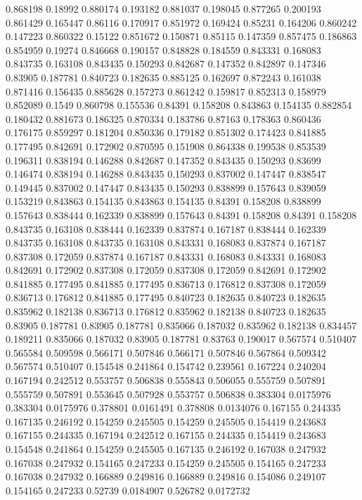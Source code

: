 0.868198 0.18992
0.880174 0.193182
0.881037 0.198045
0.877265 0.200193
0.861429 0.165447
0.86116 0.170917
0.851972 0.169424
0.85231 0.164206
0.860242 0.147223
0.860322 0.15122
0.851672 0.150871
0.85115 0.147359
0.857475 0.186863
0.854959 0.19274
0.846668 0.190157
0.848828 0.184559
0.843331 0.168083
0.843735 0.163108
0.843435 0.150293
0.842687 0.147352
0.842897 0.147346
0.83905 0.187781
0.840723 0.182635
0.885125 0.162697
0.872243 0.161038
0.871416 0.156435
0.885628 0.157273
0.861242 0.159817
0.852313 0.158979
0.852089 0.1549
0.860798 0.155536
0.84391 0.158208
0.843863 0.154135
0.882854 0.180432
0.881673 0.186325
0.870334 0.183786
0.87163 0.178363
0.860436 0.176175
0.859297 0.181204
0.850336 0.179182
0.851302 0.174423
0.841885 0.177495
0.842691 0.172902
0.870595 0.151908
0.864338 0.199538
0.853539 0.196311
0.838194 0.146288
0.842687 0.147352
0.843435 0.150293
0.83699 0.146474
0.838194 0.146288
0.843435 0.150293
0.837002 0.147447
0.838547 0.149445
0.837002 0.147447
0.843435 0.150293
0.838899 0.157643
0.839059 0.153219
0.843863 0.154135
0.843863 0.154135
0.84391 0.158208
0.838899 0.157643
0.838444 0.162339
0.838899 0.157643
0.84391 0.158208
0.84391 0.158208
0.843735 0.163108
0.838444 0.162339
0.837874 0.167187
0.838444 0.162339
0.843735 0.163108
0.843735 0.163108
0.843331 0.168083
0.837874 0.167187
0.837308 0.172059
0.837874 0.167187
0.843331 0.168083
0.843331 0.168083
0.842691 0.172902
0.837308 0.172059
0.837308 0.172059
0.842691 0.172902
0.841885 0.177495
0.841885 0.177495
0.836713 0.176812
0.837308 0.172059
0.836713 0.176812
0.841885 0.177495
0.840723 0.182635
0.840723 0.182635
0.835962 0.182138
0.836713 0.176812
0.835962 0.182138
0.840723 0.182635
0.83905 0.187781
0.83905 0.187781
0.835066 0.187032
0.835962 0.182138
0.834457 0.189211
0.835066 0.187032
0.83905 0.187781
0.83763 0.190017
0.567574 0.510407
0.565584 0.509598
0.566171 0.507846
0.566171 0.507846
0.567864 0.509342
0.567574 0.510407
0.154548 0.241864
0.154742 0.239561
0.167224 0.240204
0.167194 0.242512
0.553757 0.506838
0.555843 0.506055
0.555759 0.507891
0.555759 0.507891
0.553645 0.507928
0.553757 0.506838
0.383304 0.0175976
0.383304 0.0175976
0.378801 0.0161491
0.378808 0.0134076
0.167155 0.244335
0.167135 0.246192
0.154259 0.245505
0.154259 0.245505
0.154419 0.243683
0.167155 0.244335
0.167194 0.242512
0.167155 0.244335
0.154419 0.243683
0.154548 0.241864
0.154259 0.245505
0.167135 0.246192
0.167038 0.247932
0.167038 0.247932
0.154165 0.247233
0.154259 0.245505
0.154165 0.247233
0.167038 0.247932
0.166889 0.249816
0.166889 0.249816
0.154086 0.249107
0.154165 0.247233
0.52739 0.0184907
0.526782 0.0172732
